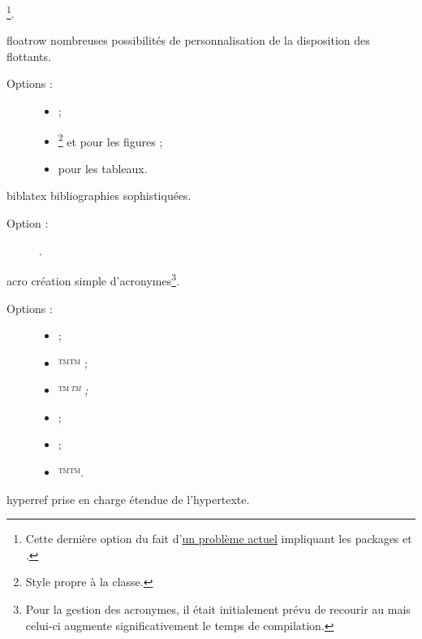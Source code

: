 \documentclass{letgut}
\begin{document}
\begin{ctannews}
\begin{description}
    \footnote{Cette dernière option du fait
      d'\href{https://github.com/FrankMittelbach/fmitex-parskip/issues/3}{un
        problème actuel} impliquant les packages  et
      .}.
  \end{description}
\item[floatrow] nombreuses possibilités de personnalisation de la disposition
  des flottants.
  \begin{description}
  \item[Options :]\leavevmode{}
    \begin{itemize}
    \item {} ;
    \item {}\footnote{Style propre à la classe.}
      et  pour les figures ;
    \item {} pour les tableaux.
    \end{itemize}
  \end{description}
\item[biblatex] bibliographies sophistiquées.
  \begin{description}
  \item[Option :] .
  \end{description}
\item[acro] création simple d'acronymes\footnote{Pour la gestion des acronymes,
    il était initialement prévu de recourir au  mais
    celui-ci augmente significativement le temps de compilation.}.
  \begin{description}
  \item[Options :]\leavevmode{}
    \begin{itemize}
    \item {} ;
    \item {}™\scshape™ ;
    \item {}™\em™ ;
    \item {} ;
    \item {} ;
    \item {}™\upshape™.
    \end{itemize}
  \end{description}
\item[hyperref] prise en charge étendue de l'hypertexte.
  \begin{description}

\end{description}
\end{ctannews}
\end{document}
